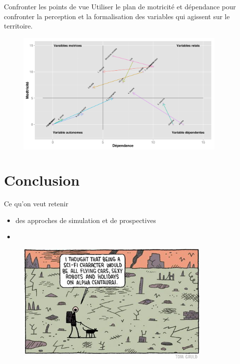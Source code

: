 \documentclass[newPxFont]{beamer}
\begin{document}
\begin{frame}[c]{Confronter les points de vue}
  \vspace{-2em}
  Utiliser le plan de motricité et dépendance pour confronter la perception et la formalisation des variables qui agissent sur le territoire.
  \begin{figure}
   \includegraphics[height=6cm]{img/a_gg_plant_de_motricite_mvt.png}
  \end{figure}
\end{frame}


%
%
\section{Conclusion}

\begin{frame}[c]{Ce qu'on veut retenir}
  \vspace{-2em}
  \begin{itemize}
    \item des approches de simulation et de prospectives
    \item
  \end{itemize}
  \begin{figure}
   \includegraphics[height=6cm]{img/a_gauld_tom_sexysifi.jpg}
  \end{figure}
\end{frame}
\end{document}
